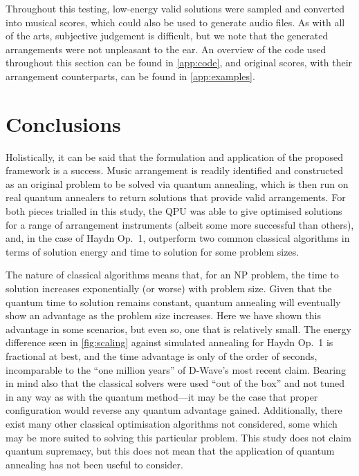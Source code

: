 \documentclass[twocolumn]{article}
\theoremstyle{definition}
\begin{document}
Throughout this testing, low-energy valid solutions were sampled and converted into musical scores, which could also be used to generate audio files. As with all of the arts, subjective judgement is difficult, but we note that the generated arrangements were not unpleasant to the ear.
An overview of the code used throughout this section can be found in \cref{app:code}, and original scores, with their arrangement counterparts, can be found in \cref{app:examples}.

\section*{Conclusions}

Holistically, it can be said that the formulation and application of the proposed framework is a success. Music arrangement is readily identified and constructed as an original problem to be solved via quantum annealing, which is then run on real quantum annealers to return solutions that provide valid arrangements. For both pieces trialled in this study, the QPU was able to give optimised solutions for a range of arrangement instruments (albeit some more successful than others), and, in the case of Haydn Op.\ 1, outperform two common classical algorithms in terms of solution energy and time to solution for some problem sizes.

The nature of classical algorithms means that, for an NP problem, the time to solution increases exponentially (or worse) with problem size. Given that the quantum time to solution remains constant, quantum annealing will eventually show an advantage as the problem size increases. Here we have shown this advantage in some scenarios, but even so, one that is relatively small. The energy difference seen in \cref{fig:scaling} against simulated annealing for Haydn Op.\ 1 is fractional at best, and the time advantage is only of the order of seconds, incomparable to the ``one million years'' of D-Wave's most recent claim. Bearing in mind also that the classical solvers were used ``out of the box'' and not tuned in any way as with the quantum method---it may be the case that proper configuration would reverse any quantum advantage gained. Additionally, there exist many other classical optimisation algorithms not considered, some which may be more suited to solving this particular problem. This study does not claim quantum supremacy, but this does not mean that the application of quantum annealing has not been useful to consider.
\end{document}
